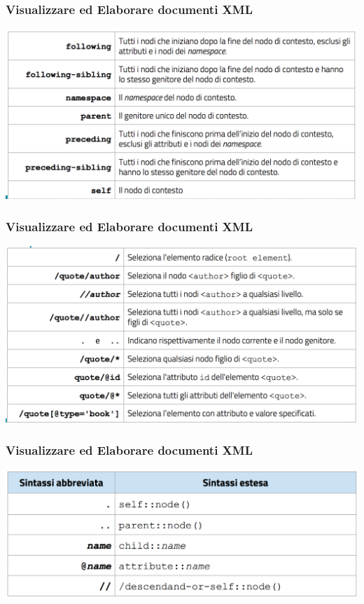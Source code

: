 \begin{frame}
    \frametitle{Visualizzare ed Elaborare documenti XML}
    \addtocounter{nframe}{1}
    
    \begin{center}
        \includegraphics[width=.95\textwidth]{imgs/Schema-Assi-2.png}
    \end{center}

\end{frame}



\begin{frame}
    \frametitle{Visualizzare ed Elaborare documenti XML}
    \addtocounter{nframe}{1}
    
    \begin{center}
        \includegraphics[width=.95\textwidth]{imgs/Sintassi-Abbreviata.png}
    \end{center}

\end{frame}


\begin{frame}
    \frametitle{Visualizzare ed Elaborare documenti XML}
    \addtocounter{nframe}{1}
    
    \begin{center}
        \includegraphics[width=.95\textwidth]{imgs/Sintassi-Abbreviata-Estesa.png}
    \end{center}

\end{frame}


